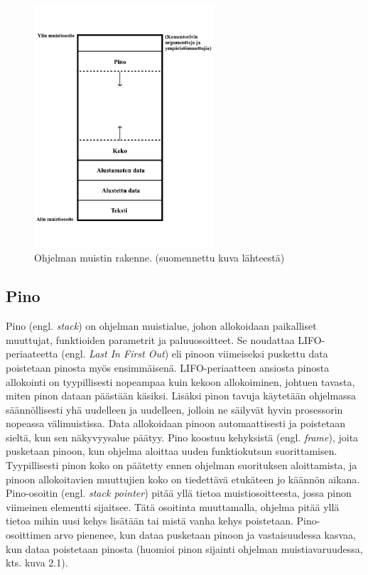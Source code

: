 \begin{figure}[tbh]
{\begin{centering}
\includegraphics[width=0.6\textwidth]{kuvat/muistin_rakenne.pdf}
\par\end{centering}}
\caption{Ohjelman muistin rakenne.\cite{mmic2010} (suomennettu kuva lähteestä)}
\end{figure}

\subsection{Pino}

Pino (engl. \textit{stack}) on ohjelman muistialue, johon allokoidaan paikalliset muuttujat, funktioiden parametrit ja paluuosoitteet. Se noudattaa LIFO-periaateetta (engl. \textit{Last In First Out}) eli pinoon viimeiseksi puskettu data poistetaan pinosta myös ensimmäisenä. LIFO-periaatteen ansiosta pinosta allokointi on tyypillisesti nopeampaa kuin kekoon allokoiminen, johtuen tavasta, miten pinon dataan päästään käsiksi. Lisäksi pinon tavuja käytetään ohjelmassa säännöllisesti yhä uudelleen ja uudelleen, jolloin ne säilyvät hyvin prosessorin nopeassa välimuistissa. Data allokoidaan pinoon automaattisesti ja poistetaan sieltä, kun sen näkyvyysalue päätyy. Pino koostuu kehyksistä (engl. \textit{frame}), joita pusketaan pinoon, kun ohjelma aloittaa uuden funktiokutsun suorittamisen. Tyypillisesti pinon koko on päätetty ennen ohjelman suorituksen aloittamista, ja pinoon allokoitavien muuttujien koko on tiedettävä etukäteen jo käännön aikana.\cite{mmic2010}
Pino-osoitin (engl. \textit{stack pointer}) pitää yllä tietoa muistiosoitteesta, jossa pinon viimeinen elementti sijaitsee. Tätä osoitinta muuttamalla, ohjelma pitää yllä tietoa mihin uusi kehys lisätään tai mistä vanha kehys poistetaan. Pino-osoittimen arvo pienenee, kun dataa pusketaan pinoon ja vastaisuudessa kasvaa, kun dataa poistetaan pinosta (huomioi pinon sijainti ohjelman muistiavaruudessa, kts. kuva 2.1).\cite{sasp2006}

